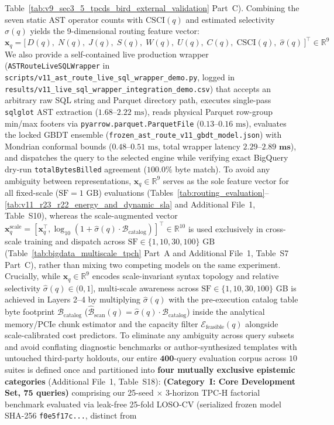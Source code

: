 \documentclass[10pt,a4paper]{article}
\begin{document}
Table~\ref{tab:v9_sec3_5_tpcds_bird_external_validation} Part~C). Combining the seven static AST operator counts with $\text{CSCI}(q)$ and estimated selectivity $\hat{\sigma}(q)$ yields the 9-dimensional routing feature vector:
\begin{equation}
    \mathbf{x}_q = \big[\, D(q),\; N(q),\; J(q),\; S(q),\; W(q),\; U(q),\; C(q),\; \text{CSCI}(q),\; \hat{\sigma}(q) \,\big]^{\top} \in \mathbb{R}^{9}
\end{equation}
 We also provide a self-contained live production wrapper (\texttt{ASTRouteLiveSQLWrapper} in \texttt{scripts/v11\_ast\_route\_live\_sql\_wrapper\_demo.py}, logged in \texttt{results/v11\_live\_sql\_wrapper\_integration\_demo.csv}) that accepts an arbitrary raw SQL string and Parquet directory path, executes single-pass \texttt{sqlglot} AST extraction ($1.68\text{--}2.22\text{ ms}$), reads physical Parquet row-group min/max footers via \texttt{pyarrow.parquet.ParquetFile} ($0.13\text{--}0.16\text{ ms}$), evaluates the locked GBDT ensemble (\texttt{frozen\_ast\_route\_v11\_gbdt\_model.json}) with Mondrian conformal bounds ($0.48\text{--}0.51\text{ ms}$, total wrapper latency $\mathbf{2.29\text{--}2.89\text{ ms}}$), and dispatches the query to the selected engine while verifying exact BigQuery dry-run \texttt{totalBytesBilled} agreement ($100.0\%$ byte match). To avoid any ambiguity between representations, $\mathbf{x}_q \in \mathbb{R}^{9}$ serves as the sole feature vector for all fixed-scale ($\text{SF}=1\text{ GB}$) evaluations (Tables~\ref{tab:routing_evaluation}--\ref{tab:v11_r23_r22_energy_and_dynamic_sla} and Additional File~1, Table~S10), whereas the scale-augmented vector $\mathbf{x}_q^{\text{scale}} = [\mathbf{x}_q^{\top}, \log_{10}(1+\hat{\sigma}(q)\cdot\mathcal{B}_{\text{catalog}})]^{\top} \in \mathbb{R}^{10}$ is used exclusively in cross-scale training and dispatch across $\text{SF}\in\{1,10,30,100\}\text{ GB}$ (Table~\ref{tab:bigdata_multiscale_tpch} Part~A and Additional File~1, Table~S7 Part~C), rather than mixing two competing models on the same experiment. Crucially, while $\mathbf{x}_q \in \mathbb{R}^9$ encodes scale-invariant syntax topology and relative selectivity $\hat{\sigma}(q) \in (0,1]$, multi-scale awareness across $\text{SF} \in \{1, 10, 30, 100\}$ GB is achieved in Layers 2--4 by multiplying $\hat{\sigma}(q)$ with the pre-execution catalog table byte footprint $\mathcal{B}_{\text{catalog}}$ ($\hat{\mathcal{B}}_{\text{scan}}(q) = \hat{\sigma}(q)\cdot \mathcal{B}_{\text{catalog}}$) inside the analytical memory/PCIe chunk estimator and the capacity filter $\mathcal{E}_{\text{feasible}}(q)$ alongside scale-calibrated cost predictors. To eliminate any ambiguity across query subsets and avoid conflating diagnostic benchmarks or author-synthesized templates with untouched third-party holdouts, our entire $\mathbf{400}$-query evaluation corpus across $10$ suites is defined once and partitioned into \textbf{four mutually exclusive epistemic categories} (Additional File~1, Table~S18): \textbf{(Category~I: Core Development Set, $\mathbf{75}$ queries)} comprising our 25-seed $\times$ 3-horizon TPC-H factorial benchmark evaluated via leak-free 25-fold LOSO-CV (serialized frozen model SHA-256 \texttt{f0e5f17c...}, distinct from 
\end{document}
